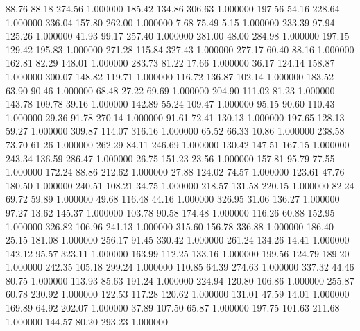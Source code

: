      88.76     88.18    274.56  1.000000
    185.42    134.86    306.63  1.000000
    197.56     54.16    228.64  1.000000
    336.04    157.80    262.00  1.000000
      7.68     75.49      5.15  1.000000
    233.39     97.94    125.26  1.000000
     41.93     99.17    257.40  1.000000
    281.00     48.00    284.98  1.000000
    197.15    129.42    195.83  1.000000
    271.28    115.84    327.43  1.000000
    277.17     60.40     88.16  1.000000
    162.81     82.29    148.01  1.000000
    283.73     81.22     17.66  1.000000
     36.17    124.14    158.87  1.000000
    300.07    148.82    119.71  1.000000
    116.72    136.87    102.14  1.000000
    183.52     63.90     90.46  1.000000
     68.48     27.22     69.69  1.000000
    204.90    111.02     81.23  1.000000
    143.78    109.78     39.16  1.000000
    142.89     55.24    109.47  1.000000
     95.15     90.60    110.43  1.000000
     29.36     91.78    270.14  1.000000
     91.61     72.41    130.13  1.000000
    197.65    128.13     59.27  1.000000
    309.87    114.07    316.16  1.000000
     65.52     66.33     10.86  1.000000
    238.58     73.70     61.26  1.000000
    262.29     84.11    246.69  1.000000
    130.42    147.51    167.15  1.000000
    243.34    136.59    286.47  1.000000
     26.75    151.23     23.56  1.000000
    157.81     95.79     77.55  1.000000
    172.24     88.86    212.62  1.000000
     27.88    124.02     74.57  1.000000
    123.61     47.76    180.50  1.000000
    240.51    108.21     34.75  1.000000
    218.57    131.58    220.15  1.000000
     82.24     69.72     59.89  1.000000
     49.68    116.48     44.16  1.000000
    326.95     31.06    136.27  1.000000
     97.27     13.62    145.37  1.000000
    103.78     90.58    174.48  1.000000
    116.26     60.88    152.95  1.000000
    326.82    106.96    241.13  1.000000
    315.60    156.78    336.88  1.000000
    186.40     25.15    181.08  1.000000
    256.17     91.45    330.42  1.000000
    261.24    134.26     14.41  1.000000
    142.12     95.57    323.11  1.000000
    163.99    112.25    133.16  1.000000
    199.56    124.79    189.20  1.000000
    242.35    105.18    299.24  1.000000
    110.85     64.39    274.63  1.000000
    337.32     44.46     80.75  1.000000
    113.93     85.63    191.24  1.000000
    224.94    120.80    106.86  1.000000
    255.87     60.78    230.92  1.000000
    122.53    117.28    120.62  1.000000
    131.01     47.59     14.01  1.000000
    169.89     64.92    202.07  1.000000
     37.89    107.50     65.87  1.000000
    197.75    101.63    211.68  1.000000
    144.57     80.20    293.23  1.000000
